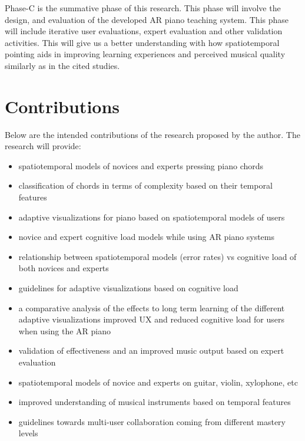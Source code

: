 \documentclass[manuscript,screen]{acmart}
\begin{document}
Phase-C is the summative phase of this research. This phase will involve the design, and evaluation of the developed AR  piano teaching system. This phase will include iterative user evaluations, expert evaluation and other validation activities. This will give us a better understanding with how spatiotemporal pointing aids in improving learning experiences and perceived musical quality similarly as in the cited studies.\\


\section{Contributions}
Below are the intended contributions of the research proposed by the author. The research will provide: 
\begin{itemize}
    \item spatiotemporal models of novices and experts pressing piano chords
    \item classification of chords in terms of complexity based on their temporal features
    \item adaptive visualizations for piano based on spatiotemporal models of users
    \item novice and expert cognitive load models while using AR piano systems
    \item relationship between spatiotemporal models (error rates) vs cognitive load of both novices and experts
    \item guidelines for adaptive visualizations based on cognitive load
    \item a comparative analysis of the effects to long term learning of the different adaptive visualizations
    \items improved UX and reduced cognitive load for users when using the AR piano
    \item validation of effectiveness and an improved music output based on expert evaluation
    \item spatiotemporal models of novice and experts on guitar, violin, xylophone, etc
    \item improved understanding of musical instruments based on temporal features
    \item guidelines towards multi-user collaboration coming from different mastery levels
\end{itemize}
\end{document}
